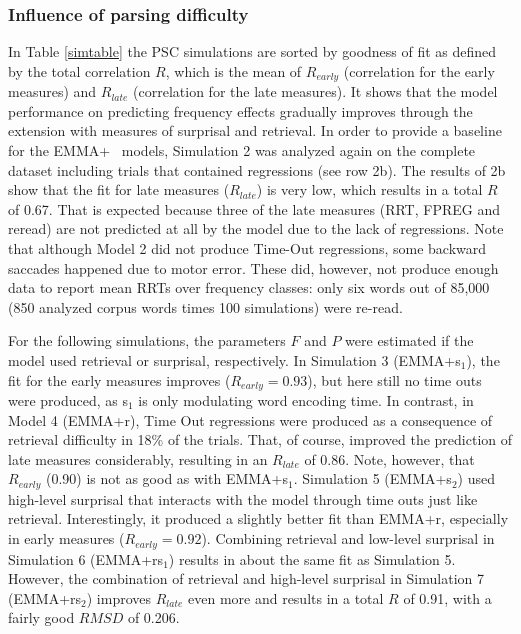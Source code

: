 \subsubsection{Influence of parsing difficulty}
In Table \ref{simtable} the PSC simulations are sorted by goodness of fit as defined by the total correlation $R$, which is the mean of $R_{early}$ (correlation for the early measures) and $R_{late}$ (correlation for the late measures).  It shows that the model performance on predicting frequency effects gradually improves through the extension with measures of surprisal and retrieval.
In order to provide a baseline for the EMMA+ ~models, Simulation 2 was analyzed again on the complete dataset including trials that contained regressions (see row 2b). 
The results of 2b show that the fit for late measures ($R_{late}$) is very low, which results in a total $R$ of 0.67. That is expected because three of the late measures (RRT, FPREG and reread) are not predicted at all by the model due to the lack of regressions.  Note that although Model 2 did not produce  Time-Out regressions, some backward saccades happened due to motor error.  These did, however, not produce enough data to report mean RRTs over frequency classes: only six words out of 85,000 (850 analyzed corpus words times 100 simulations) were re-read. 

For the following simulations, the parameters $F$ and $P$ were estimated if the model used retrieval or surprisal, respectively.
In Simulation 3 (EMMA+s$_1$), the fit for the early measures improves ($R_{early}=0.93$), but here still no time outs were produced, as s$_1$ is only modulating word encoding time.  In contrast, in Model 4 (EMMA+r), Time Out regressions were produced as a consequence of retrieval difficulty in 18\% of the trials.  That, of course, improved the prediction of late measures considerably, resulting in an $R_{late}$ of 0.86.  Note, however, that $R_{early}$ (0.90) is not as good as with EMMA+s$_1$.  
Simulation 5 (EMMA+s$_2$) used high-level surprisal that interacts with the model through time outs just like retrieval.  Interestingly, it produced a slightly better fit than EMMA+r, especially in early measures ($R_{early}=0.92$).  Combining retrieval and low-level surprisal in Simulation 6 (EMMA+rs$_1$) results in about the same fit as Simulation 5.  However, the combination of retrieval and high-level surprisal in Simulation 7 (EMMA+rs$_2$) improves $R_{late}$ even more and results in a total $R$ of 0.91, with a fairly good $RMSD$ of 0.206. 


